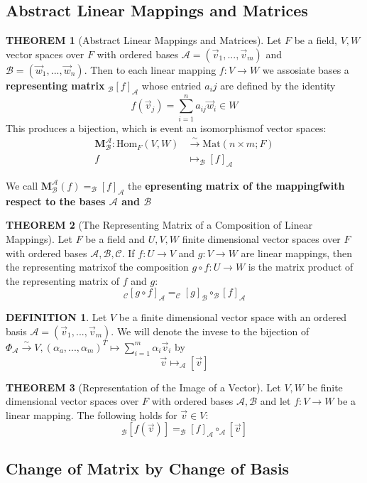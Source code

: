 \documentclass[12pt]{article}
\theoremstyle{definition}
\newtheorem{definition}{DEFINITION}[subsection]
\newtheorem{theorem}{THEOREM}[subsection]
\newcommand{\Hom}{\text{Hom}}
\newcommand{\Mat}{\text{Mat}}
\newcommand{\vect}[1]{\overrightarrow{#1}}
\begin{document}
\subsection{Abstract Linear Mappings and Matrices}
\begin{theorem}[Abstract  Linear  Mappings  and  Matrices]
    Let $F$ be a field, $V,W$ vector spaces over $F$ with ordered bases $\mathcal{A} = (\vect{v}_1,...,\vect{v}_m)$ and $\mathcal{B} = (\vect{w}_1,...,\vect{w}_n)$. Then to each linear mapping $f:V\rightarrow W$ we assosiate bases a \textbf{representing matrix} $_\mathcal{B}[f]_\mathcal{A}$ whose entried $a_ij$ are defined by the identity $$f(\vect{v}_j) = \sum_{i=1}^n{a_{ij}\vect{w}_i}\in W$$
    This produces a bijection, which is event an isomorphismof vector spaces:
    \[\begin{split}
        \textbf{M}_\mathcal{B}^\mathcal{A}: \Hom_F(V,W) &\stackrel{\sim}{\rightarrow} \Mat(n \times m; F)\\
        f &\mapsto _\mathcal{B}[f]_\mathcal{A} 
    \end{split}\]
\end{theorem}
We call $\textbf{M}_\mathcal{B}^\mathcal{A}(f) = _\mathcal{B}[f]_\mathcal{A}$ the \textbf{epresenting matrix of the mappingfwith respect to the bases $\mathcal{A}$ and $\mathcal{B}$}

\begin{theorem}[The Representing Matrix of a Composition of Linear Mappings]
    Let $F$ be a field and $U,V,W$ finite dimensional vector spaces over $F$ with ordered bases $\mathcal{A,B,C}$. If $f:U\rightarrow V$ and $g:V \rightarrow W$ are linear mappings, then the representing matrixof the composition $g \circ f: U \rightarrow W$ is the matrix product of the representing matrix of $f$ and $g$: $$_\mathcal{C}[g\circ f]_\mathcal{A} = _\mathcal{C}[g]_\mathcal{B} \circ _\mathcal{B}[f]_\mathcal{A}$$
\end{theorem}

\begin{definition}
    Let $V$ be a finite dimensional vector space with an ordered basis $\mathcal{A} = (\vect{v}_1,...,\vect{v}_m)$. We will denote the invese to the bijection of $\Phi_\mathcal{A} \stackrel{\sim}{\rightarrow} V,(\alpha_a,...,\alpha_m)^T \mapsto \sum_{i=1}^m{\alpha_i\vect{v}_i}$ by
    $$\vect{v} \mapsto _\mathcal{A}[\vect{v}]$$
\end{definition}

\begin{theorem}[Representation of the Image of a Vector]
    Let $V,W$ be finite dimensional vector spaces over $F$ with ordered bases $\mathcal{A,B}$ and let $f:V\rightarrow W$ be a linear mapping. The following holds for $\vect{v} \in V$:
    $$_\mathcal{B}[f(\vect{v})] = _\mathcal{B}[f]_\mathcal{A} \circ _\mathcal{A}[\vect{v}]$$
\end{theorem}

\subsection{Change of Matrix by Change of Basis}
\end{document}
